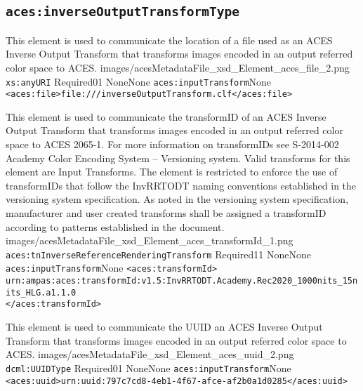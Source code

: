 \subsection{\texttt{aces:inverseOutputTransformType}}

		{This element is used to communicate the location of a file used as an ACES Inverse Output Transform that transforms images encoded in an output referred color space to ACES.}
		{images/acesMetadataFile_xsd_Element_aces_file_2.png}
		{\texttt{xs:anyURI}}
		{Required}{0}{1}
		{None}{None}
		{\texttt{aces:inputTransform}}{None}
		{\lstinline{<aces:file>file:///inverseOutputTransform.clf</aces:file>}}

        {This element is used to communicate the transformID of an ACES Inverse Output Transform that transforms images encoded in an output referred color space to ACES 2065-1.  For more information on transformIDs see S-2014-002 Academy Color Encoding System -- Versioning system.  Valid transforms for this element are Input Transforms.  The element is restricted to enforce the use of transformIDs that follow the InvRRTODT naming conventions established in the versioning system specification.  As noted in the versioning system specification, manufacturer and user created transforms shall be assigned a transformID according to patterns established in the document.}
        {images/acesMetadataFile_xsd_Element_aces_transformId_1.png}
        {\texttt{aces:tnInverseReferenceRenderingTransform}}
        {Required}{1}{1}
        {None}{None}
        {\texttt{aces:inputTransform}}{None}
        {\lstinline{<aces:transformId>}\\
        \lstinline{urn:ampas:aces:transformId:v1.5:InvRRTODT.Academy.Rec2020_1000nits_15nits_HLG.a1.1.0}\\
        \lstinline{</aces:transformId>}}
        
		{This element is used to communicate the UUID an ACES Inverse Output Transform that transforms images encoded in an output referred color space to ACES.}
		{images/acesMetadataFile_xsd_Element_aces_uuid_2.png}
		{\texttt{dcml:UUIDType}}
		{Required}{0}{1}
		{None}{None}
		{\texttt{aces:inputTransform}}{None}
		{\lstinline{<aces:uuid>urn:uuid:797c7cd8-4eb1-4f67-afce-af2b0a1d0285</aces:uuid>}}
